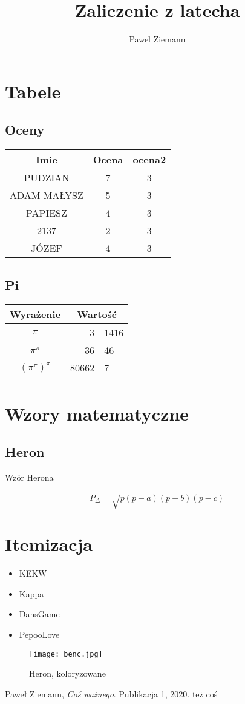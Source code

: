 \documentclass{article}
\title{Zaliczenie z latecha}
\author{Pawel Ziemann}
\begin{document}
\maketitle
\newpage
\tableofcontents
\listoffigures
\section{Tabele}
\subsection{Oceny}
\begin{table}[h]
\begin{tabular}{|c|c|c|}
\hline
Imie & Ocena & ocena2\\ 
\hline 
PUDZIAN & 7 & 3\\ 
\hline 
ADAM MAŁYSZ & 5 & 3\\ 
\hline 
PAPIESZ & 4 & 3\\
\hline 
2137 & 2 & 3\\ 
\hline 
JÓZEF & 4 & 3\\ 
\hline 
\end{tabular}
\end {table}
\subsection{Pi}
\begin{tabular}{c r @{,} l}
Wyrażenie &
\multicolumn{2}{c}{Wartość}\\ \hline %
$\pi$ & 3&1416 \\
$\pi^{\pi}$ & 36&46 \\
$(\pi^{\pi})^{\pi}$ & 80662&7 \\
\end{tabular}
\section{Wzory matematyczne}
\subsection{Heron}
\begin{center}
{\LARGE Wzór Herona }
\end{center}
\begin{equation}
\mathit{P_\Delta} = \sqrt{p(p-a)(p-b)(p-c)}
\end{equation}
\section{Itemizacja}
\begin{itemize}
\item KEKW
\item Kappa
\item DansGame
\item PepooLove
\end{itemize}
\begin{figure}
\texttt{[image: benc.jpg]}
\caption{Heron, koloryzowane}
\end{figure}
\begin{thebibliography}{9}
 Paweł Ziemann,
 \emph{Coś ważnego}.
 Publikacja 1,
 2020.
 też coś
\end{thebibliography}
\end{document}
